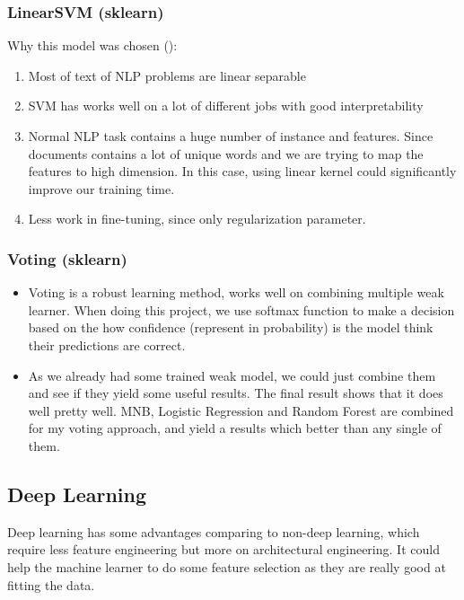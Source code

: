 \documentclass[11pt]{article}
\begin{document}
\subsubsection{LinearSVM (sklearn)}
Why this model was chosen ():
\begin{enumerate}
      \item Most of text of NLP problems are linear separable
      \item SVM has works well on a lot of different jobs with good interpretability
      \item Normal NLP task contains a huge number of instance and features.
            Since documents contains a lot of unique words and we are trying to
            map the features to high dimension. In this case, using linear
            kernel could significantly improve our training time.
      \item Less work in fine-tuning, since only regularization parameter.
\end{enumerate}

\subsubsection{Voting (sklearn)}
\begin{itemize}
      \item Voting is a robust learning method, works well on combining
            multiple weak learner. When doing this project, we use softmax function
            to make a decision based on the how confidence (represent in probability) 
            is the model think their predictions are correct.
      \item As we already had some trained weak model, we could just combine them and 
            see if they yield some useful results. The final result shows that it does
            well pretty well. MNB, Logistic Regression and Random Forest are combined 
            for my voting approach, and yield a results which better than any single 
            of them.
            
\end{itemize}

\subsection{Deep Learning}
Deep learning has some advantages comparing to non-deep learning, which require less
feature engineering but more on architectural engineering. It could help the machine 
learner to do some feature selection as they are really good at fitting the data.
\end{document}
